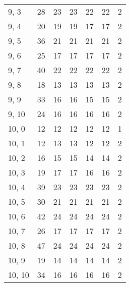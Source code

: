 \begin{table}
\begin{tabular}{lrrrrrr}
9, 3   &          28 &           23 &         23 &           22 &        22 &      2 \\
9, 4   &          20 &           19 &         19 &           17 &        17 &      2 \\
9, 5   &          36 &           21 &         21 &           21 &        21 &      2 \\
9, 6   &          25 &           17 &         17 &           17 &        17 &      2 \\
9, 7   &          40 &           22 &         22 &           22 &        22 &      2 \\
9, 8   &          18 &           13 &         13 &           13 &        13 &      2 \\
9, 9   &          33 &           16 &         16 &           15 &        15 &      2 \\
9, 10  &          24 &           16 &         16 &           16 &        16 &      2 \\
10, 0  &          12 &           12 &         12 &           12 &        12 &      1 \\
10, 1  &          12 &           13 &         13 &           12 &        12 &      2 \\
10, 2  &          16 &           15 &         15 &           14 &        14 &      2 \\
10, 3  &          19 &           17 &         17 &           16 &        16 &      2 \\
10, 4  &          39 &           23 &         23 &           23 &        23 &      2 \\
10, 5  &          30 &           21 &         21 &           21 &        21 &      2 \\
10, 6  &          42 &           24 &         24 &           24 &        24 &      2 \\
10, 7  &          26 &           17 &         17 &           17 &        17 &      2 \\
10, 8  &          47 &           24 &         24 &           24 &        24 &      2 \\
10, 9  &          19 &           14 &         14 &           14 &        14 &      2 \\
10, 10 &          34 &           16 &         16 &           16 &        16 &      2 \\
\bottomrule
\end{tabular}
\end{table}
